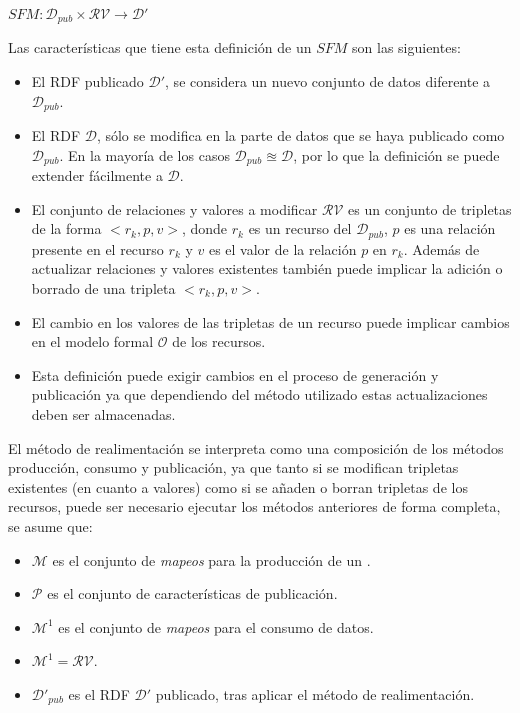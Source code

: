 \begin{center}
    $SFM :  \mathcal{D}_{pub} \times \mathcal{RV} \longrightarrow \mathcal{D}'$
\end{center}
Las características que tiene esta definición de un $SFM$  son las siguientes:
\begin{itemize}
 \item El \dataset RDF publicado $\mathcal{D}'$, se considera un nuevo conjunto
de datos diferente a $\mathcal{D}_{pub}$.
 \item El \dataset RDF $\mathcal{D}$, sólo se modifica en la parte de datos
que se haya publicado como $\mathcal{D}_{pub}$. En la mayoría de los casos $\mathcal{D}_{pub} \approxeq \mathcal{D}$, por lo
que la definición se puede extender fácilmente a $\mathcal{D}$.
 \item El conjunto de relaciones y valores a modificar $\mathcal{RV}$ es un conjunto de tripletas
de la forma $<r_k,p,v>$, donde $r_k$ es un recurso del \dataset $\mathcal{D}_{pub}$, $p$ es una relación
presente en el recurso $r_k$ y $v$ es el valor de la relación $p$ en $r_k$. Además de actualizar
relaciones y valores existentes también puede implicar la adición o borrado de una tripleta $<r_k,p,v>$.
 \item El cambio en los valores de las tripletas de un recurso puede implicar cambios en el modelo
formal $\mathcal{O}$ de los recursos.
 \item Esta definición puede exigir cambios en el proceso de generación y publicación ya que dependiendo
del método utilizado estas actualizaciones deben ser almacenadas.
 \end{itemize}

El método de realimentación se interpreta como una composición de los métodos producción, consumo y publicación, ya que 
tanto si se modifican tripletas existentes (en cuanto a valores) como si se añaden o borran tripletas de los recursos, 
puede ser necesario ejecutar los métodos anteriores de forma completa, se asume que:
\begin{itemize}
 \item $\mathcal{M}$ es el conjunto de \textit{mapeos} para la producción de un \dataset.
 \item $\mathcal{P}$ es el  conjunto de características de publicación.
 \item $\mathcal{M}^1$ es el conjunto de \textit{mapeos} para el consumo de datos.
 \item $\mathcal{M}^1 = \mathcal{RV} $.
 \item $\mathcal{D}'_{pub}$ es el \dataset RDF $\mathcal{D}'$ publicado, tras aplicar el método de realimentación.
\end{itemize}


